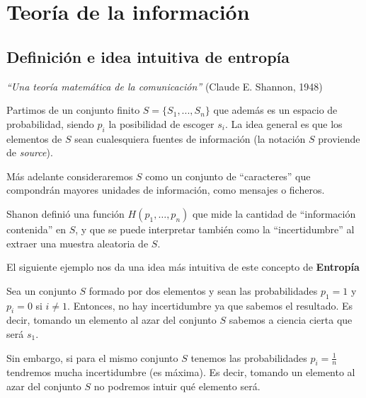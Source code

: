 \chapter{Teoría de la información}


\section{Definición e idea intuitiva de entropía}

	\textit{``Una teoría matemática de la comunicación''} (Claude E. Shannon, 1948)

	Partimos de un conjunto finito $S = \{ S_1, ... , S_n \}$ que además es un espacio de probabilidad, siendo $p_i$ la posibilidad de escoger $s_i$. La idea general es que los elementos de $S$ sean cualesquiera fuentes de información (la notación $S$ proviende de \textit{source}).

	Más adelante consideraremos $S$ como un conjunto de ``caracteres'' que compondrán mayores unidades de información, como mensajes o ficheros.

	\begin{defn}[Entropía]
		Shanon definió una función $ H(p_1, \dotsc, p_n)$ que mide la cantidad de ``información contenida'' en $S$, y que se puede interpretar también como la ``incertidumbre'' al extraer una muestra aleatoria de $S$.
	\end{defn}

	El siguiente ejemplo nos da una idea más intuitiva de este concepto de \textbf{Entropía}

	\begin{example}
		Sea un conjunto $S$ formado por dos elementos y sean las probabilidades $p_1 = 1$ y $p_i = 0$ si $i \neq 1$. Entonces, no hay incertidumbre ya que sabemos el resultado. Es decir, tomando un elemento al azar del conjunto $S$ sabemos a ciencia cierta que será $s_1$.

		Sin embargo, si para el mismo conjunto $S$ tenemos las probabilidades $p_i = \frac{1}{n}$ tendremos mucha incertidumbre (es máxima). Es decir, tomando un elemento al azar del conjunto $S$ no podremos intuir qué elemento será.
	\end{example}


